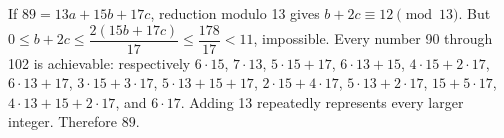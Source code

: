 If $89=13a+15b+17c$, reduction modulo 13 gives $b+2c\equiv12\pmod{13}$. But $0\le b+2c\le\dfrac{2(15b+17c)}{17}\le\dfrac{178}{17}<11$, impossible. Every number 90 through 102 is achievable: respectively $6\cdot15$, $7\cdot13$, $5\cdot15+17$, $6\cdot13+15$, $4\cdot15+2\cdot17$, $6\cdot13+17$, $3\cdot15+3\cdot17$, $5\cdot13+15+17$, $2\cdot15+4\cdot17$, $5\cdot13+2\cdot17$, $15+5\cdot17$, $4\cdot13+15+2\cdot17$, and $6\cdot17$. Adding 13 repeatedly represents every larger integer. Therefore $\boxed{89}$.
